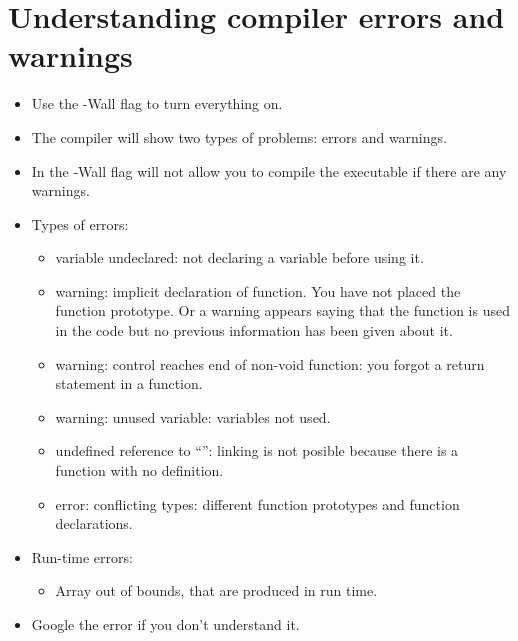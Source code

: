 \section{Understanding compiler errors and warnings}
\begin{itemize}
    \item Use the -Wall flag to turn everything on.
    \item The compiler will show two types of problems: errors and warnings. 
    \item In the -Wall flag will not allow you to compile the executable if there are any warnings. 
    \item Types of errors: 
        \begin{itemize}
            \item variable undeclared: not declaring a variable before using it. 
            \item warning: implicit declaration of function. You have not placed the function prototype. Or a warning appears saying that the function is used in the code but no previous information has been given about it.
            \item warning: control reaches end of non-void function: you forgot a return statement in a function. 
            \item warning: unused variable: variables not used. 
            \item undefined reference to ``'': linking is not posible because there is a function with no definition. 
            \item error: conflicting types: different function prototypes and function declarations.  
        \end{itemize}
    \item Run-time errors: 
        \begin{itemize}
            \item Array out of bounds, that are produced in run time. 
        \end{itemize}
    
    \item Google the error if you don't understand it. 
\end{itemize}
